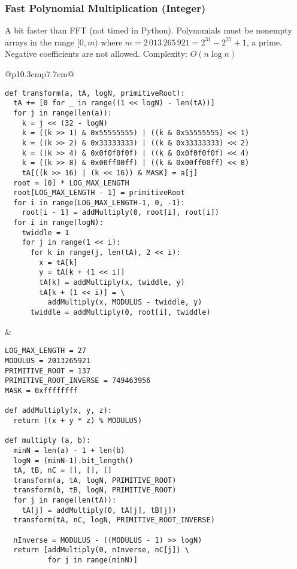 \documentclass[letterpaper]{article}
\begin{document}
\clearpage

\subsubsection{Fast Polynomial Multiplication (Integer)}
A bit faster than FFT (not timed in Python). Polynomials must be nonempty arrays in the range $[0, m)$ where $m = 2\,013\,265\,921 = 2^{31} - 2^{27} + 1$, a prime. Negative coefficients are not allowed. Complexity: $O\left(n\log n\right)$

\begin{tabular}{@{}p{10.3cm}p{7.7cm}@{}}
    \begin{lstlisting}
def transform(a, tA, logN, primitiveRoot):
  tA += [0 for _ in range((1 << logN) - len(tA))]
  for j in range(len(a)):
    k = j << (32 - logN)
    k = ((k >> 1) & 0x55555555) | ((k & 0x55555555) << 1)
    k = ((k >> 2) & 0x33333333) | ((k & 0x33333333) << 2)
    k = ((k >> 4) & 0x0f0f0f0f) | ((k & 0x0f0f0f0f) << 4)
    k = ((k >> 8) & 0x00ff00ff) | ((k & 0x00ff00ff) << 8)
    tA[((k >> 16) | (k << 16)) & MASK] = a[j]
  root = [0] * LOG_MAX_LENGTH
  root[LOG_MAX_LENGTH - 1] = primitiveRoot
  for i in range(LOG_MAX_LENGTH-1, 0, -1):
    root[i - 1] = addMultiply(0, root[i], root[i])
  for i in range(logN):
    twiddle = 1
    for j in range(1 << i):
      for k in range(j, len(tA), 2 << i):
        x = tA[k]
        y = tA[k + (1 << i)]
        tA[k] = addMultiply(x, twiddle, y)
        tA[k + (1 << i)] = \
          addMultiply(x, MODULUS - twiddle, y)
      twiddle = addMultiply(0, root[i], twiddle)
\end{lstlisting}
     &
    \begin{lstlisting}
LOG_MAX_LENGTH = 27
MODULUS = 2013265921
PRIMITIVE_ROOT = 137
PRIMITIVE_ROOT_INVERSE = 749463956
MASK = 0xffffffff

def addMultiply(x, y, z):
  return ((x + y * z) % MODULUS)

def multiply (a, b):
  minN = len(a) - 1 + len(b)
  logN = (minN-1).bit_length()
  tA, tB, nC = [], [], []
  transform(a, tA, logN, PRIMITIVE_ROOT)
  transform(b, tB, logN, PRIMITIVE_ROOT)
  for j in range(len(tA)):
    tA[j] = addMultiply(0, tA[j], tB[j])
  transform(tA, nC, logN, PRIMITIVE_ROOT_INVERSE)

  nInverse = MODULUS - ((MODULUS - 1) >> logN)
  return [addMultiply(0, nInverse, nC[j]) \
          for j in range(minN)]
\end{lstlisting}
\end{tabular}
\end{document}
